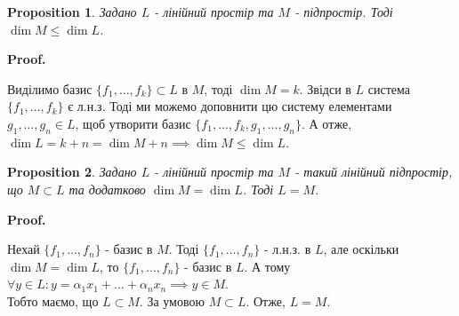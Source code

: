 \documentclass[a4paper, 10pt]{article}
\makeatletter
\theoremstyle{theoremdd}
\newtheorem{theorem}{Theorem}[subsection]
\newtheorem{proposition}[theorem]{Proposition}
\renewenvironment{proof}[1][Proof.\\]{\par
\pushQED{\hfill \qed}%
\normalfont \topsep6\p@\@plus6\p@\relax
\trivlist
\item\relax
{\bfseries
#1\@addpunct{.}}\hspace\labelsep\ignorespaces
}{%
\popQED\endtrivlist\@endpefalse
}
\makeatother
\begin{document}
	\begin{proposition}
	Задано $L$ - лінійний простір та $M$ - підпростір. Тоді $\dim M \leq \dim L$.
	\end{proposition}
	
	\begin{proof}
	Виділимо базис $\{f_1,\dots,f_k\} \subset L$ в $M$, тоді $\dim M = k$. Звідси в $L$ система $\{f_1,\dots,f_k\}$ є л.н.з. Тоді ми можемо доповнити цю систему елементами $g_1,\dots,g_n \in L$, щоб утворити базис $\{f_1,\dots,f_k,g_1,\dots,g_n\}$. А отже, $\dim L = k+n = \dim M + n \implies \dim M \leq \dim L$.
	\end{proof}
	
	\begin{proposition}
	\label{about_same_dim_prp}
	Задано $L$ - лінійний простір та $M$ - такий лінійний підпростір, що $M \subset L$ та додатково $\dim M = \dim L$. Тоді $L=M$.
	\end{proposition}
	
	\begin{proof}
	Нехай $\{f_1,\dots,f_n\}$ - базис в $M$. Тоді $\{f_1,\dots,f_n\}$ - л.н.з. в $L$, але оскільки $\dim M = \dim L$, то $\{f_1,\dots,f_n\}$ - базис в $L$. А тому $\forall y \in L: y = \alpha_1 x_1 + \dots + \alpha_n x_n \implies y \in M$.\\
	Тобто маємо, що $L \subset M$. За умовою $M \subset L$. Отже, $L=M$.
	\end{proof}
	
	\iffalse
	\begin{theorem}
	Задано $L$ - лінійний простір. Тоді будь-яка л.н.з. система може бути розширена до базиса $L$.
	\end{theorem}
	
	\begin{proof}
	Нехай $\{x_1,\dots,x_t\}$ - якась л.н.з. система. Є два варіанти:\\
	- уже max л.н.з. - тоді автоматично базис;\\
	- ще не max л.н.з.\\
	У другому випадку можна знайти елемент $x_{t+1}$, щоб система $\{x_1,\dots,x_t,x_{t+1}\}$ була л.н.з. Є знову два варіанти:\\
	- уже max л.н.з. - тоді автоматично базис;\\
	- ще не max л.н.з.\\
	У другому випадку можна знайти елемент $x_{t+2}$, щоб система $\{x_1,\dots,x_t,x_{t+2}\}$ була л.н.з.\\
	\vdots \\
	Продовжуючи ці кроки, рано чи пізно ми закінчимо додавати елементи в силу того, що $L$ - скінченно вимірний.
	\end{proof}
	\fi
	
\end{document}
